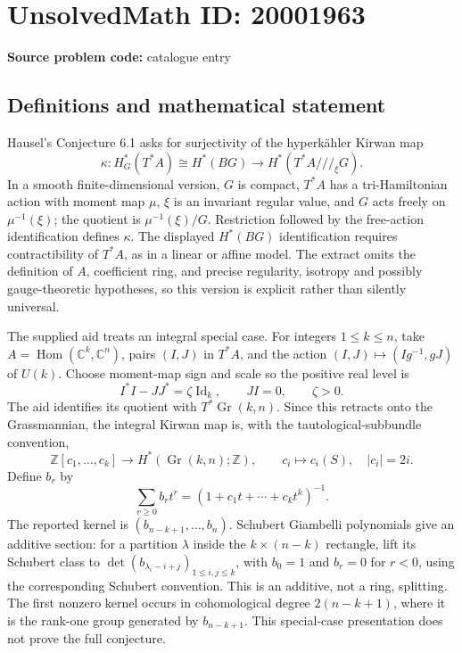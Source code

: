 \documentclass[11pt]{article}
\newcommand{\Z}{\mathbb{Z}}
\newcommand{\C}{\mathbb{C}}
\begin{document}
\section*{UnsolvedMath ID: 20001963}
\textbf{Source problem code:} catalogue entry
\subsection{Definitions and mathematical statement}
Hausel's Conjecture 6.1 asks for surjectivity of the hyperk\"ahler Kirwan map
\[
\kappa:H_G^*(T^*A)\cong H^*(BG)\longrightarrow H^*(T^*A\mathbin{///}_{\xi}G).
\]
In a smooth finite-dimensional version, \(G\) is compact, \(T^*A\) has a tri-Hamiltonian action with moment map \(\mu\), \(\xi\) is an invariant regular value, and \(G\) acts freely on \(\mu^{-1}(\xi)\); the quotient is \(\mu^{-1}(\xi)/G\). Restriction followed by the free-action identification defines \(\kappa\). The displayed \(H^*(BG)\) identification requires contractibility of \(T^*A\), as in a linear or affine model. The extract omits the definition of \(A\), coefficient ring, and precise regularity, isotropy and possibly gauge-theoretic hypotheses, so this version is explicit rather than silently universal.

The supplied aid treats an integral special case. For integers \(1\leq k\leq n\), take \(A=\operatorname{Hom}(\C^k,\C^n)\), pairs \((I,J)\) in \(T^*A\), and the action \((I,J)\mapsto(Ig^{-1},gJ)\) of \(U(k)\). Choose moment-map sign and scale so the positive real level is
\[
I^*I-JJ^*=\zeta\operatorname{Id}_k,\qquad JI=0,\qquad\zeta>0.
\]
The aid identifies its quotient with \(T^*\operatorname{Gr}(k,n)\). Since this retracts onto the Grassmannian, the integral Kirwan map is, with the tautological-subbundle convention,
\[
\Z[c_1,\ldots,c_k]\longrightarrow H^*(\operatorname{Gr}(k,n);\Z),
\qquad c_i\longmapsto c_i(S),\quad |c_i|=2i.
\]
Define \(b_r\) by
\[
\sum_{r\geq0}b_rt^r=(1+c_1t+\cdots+c_kt^k)^{-1}.
\]
The reported kernel is \((b_{n-k+1},\ldots,b_n)\). Schubert Giambelli polynomials give an additive section: for a partition \(\lambda\) inside the \(k\times(n-k)\) rectangle, lift its Schubert class to \(\det(b_{\lambda_i-i+j})_{1\leq i,j\leq k}\), with \(b_0=1\) and \(b_r=0\) for \(r<0\), using the corresponding Schubert convention. This is an additive, not a ring, splitting. The first nonzero kernel occurs in cohomological degree \(2(n-k+1)\), where it is the rank-one group generated by \(b_{n-k+1}\). This special-case presentation does not prove the full conjecture.
\end{document}
